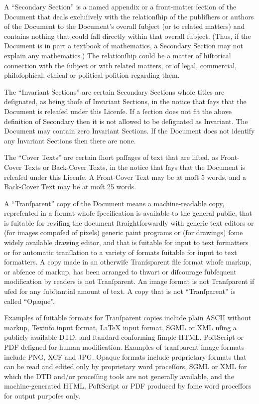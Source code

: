A “Secondary Section” is a named appendix or a front-matter ſection of 
the Document that deals excluſively with the relationſhip of the 
publiſhers or authors of the Document to the Document’s overall ſubject 
(or to related matters) and contains nothing that could fall directly 
within that overall ſubject. (Thus, if the Document is in part a 
textbook of mathematics, a Secondary Section may not explain any 
mathematics.)  The relationſhip could be a matter of hiſtorical 
connection with the ſubject or with related matters, or of legal, 
commercial, philoſophical, ethical or political poſition regarding them.

The “Invariant Sections” are certain Secondary Sections whoſe titles are 
deſignated, as being thoſe of Invariant Sections, in the notice that 
ſays that the Document is releaſed under this Licenſe. If a ſection does 
not fit the above definition of Secondary then it is not allowed to be 
deſignated as Invariant. The Document may contain zero Invariant 
Sections. If the Document does not identify any Invariant Sections then 
there are none.

The “Cover Texts” are certain ſhort paſſages of text that are liſted, as 
Front-Cover Texts or Back-Cover Texts, in the notice that ſays that the 
Document is releaſed under this Licenſe. A Front-Cover Text may be at 
moſt 5 words, and a Back-Cover Text may be at moſt 25 words.

A “Tranſparent” copy of the Document means a machine-readable copy, 
repreſented in a format whoſe ſpecification is available to the general 
public, that is ſuitable for reviſing the document ſtraightforwardly 
with generic text editors or (for images compoſed of pixels) generic 
paint programs or (for drawings) ſome widely available drawing editor, 
and that is ſuitable for input to text formatters or for automatic 
tranſlation to a variety of formats ſuitable for input to text 
formatters. A copy made in an otherwiſe Tranſsparent file format whoſe 
markup, or abſence of markup, has been arranged to thwart or diſcourage 
ſubſequent modification by readers is not Tranſparent. An image format 
is not Tranſparent if uſed for any ſubſtantial amount of text. A copy 
that is not “Tranſparent” is called “Opaque”.

Examples of ſuitable formats for Tranſparent copies include plain ASCII 
without markup, Texinfo input format, LaTeX input format, SGML or XML 
uſing a publicly available DTD, and ſtandard-conforming ſimple HTML, 
PoſtScript or PDF deſigned for human modification. Examples of 
tranſparent image formats include PNG, XCF and JPG. Opaque formats 
include proprietary formats that can be read and edited only by 
proprietary word proceſſors, SGML or XML for which the DTD and/or 
proceſſing tools are not generally available, and the machine-generated 
HTML, PoſtScript or PDF produced by ſome word proceſſors for output 
purpoſes only.

